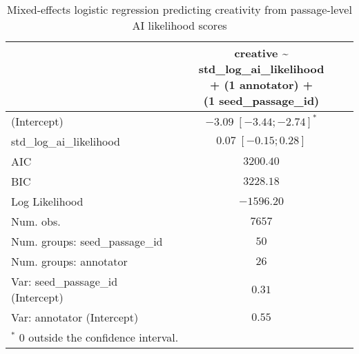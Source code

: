 
\usepackage{booktabs}

\begin{table}[htbp]
\begin{center}
\begin{tabular}{l c}
\toprule
 & \shortstack[l]{creative \textasciitilde{} std\_log\_ai\_likelihood  \\ 
+ (1 \textbar{} annotator) + \\ 
(1 \textbar{} seed\_passage\_id)} \\
\midrule
(Intercept)                        & $-3.09 \; [-3.44; -2.74]^{*}$ \\
std\_log\_ai\_likelihood           & $0.07 \; [-0.15;  0.28]$      \\
\midrule
AIC                                & $3200.40$                     \\
BIC                                & $3228.18$                     \\
Log Likelihood                     & $-1596.20$                    \\
Num. obs.                          & $7657$                        \\
Num. groups: seed\_passage\_id     & $50$                          \\
Num. groups: annotator             & $26$                          \\
Var: seed\_passage\_id (Intercept) & $0.31$                        \\
Var: annotator (Intercept)         & $0.55$                        \\
\bottomrule
\multicolumn{2}{l}{\scriptsize{$^*$ 0 outside the confidence interval.}}
\end{tabular}
\caption{Mixed-effects logistic regression predicting creativity from passage-level AI likelihood scores}
\label{tab:glmer_nov_ail}
\end{center}
\end{table}
